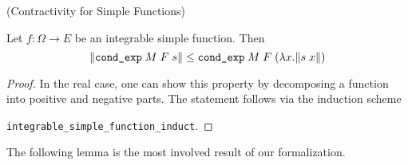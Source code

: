 \begin{lemma} (Contractivity for Simple Functions) \par
	Let $f : \Omega \rightarrow E$ be an integrable simple function. Then
	\[
		\normalfont\lVert \texttt{cond\_exp} \; M \; F \; s \rVert \le \texttt{cond\_exp} \; M \; F \; (\lambda x. \lVert s \; x \rVert)
	\]
\end{lemma}
\begin{proof}
	In the real case, one can show this property by decomposing a function into positive and negative parts. The statement follows via the induction scheme \par\noindent\texttt{integrable\_simple\_function\_induct}. 
\end{proof}

The following lemma is the most involved result of our formalization.

